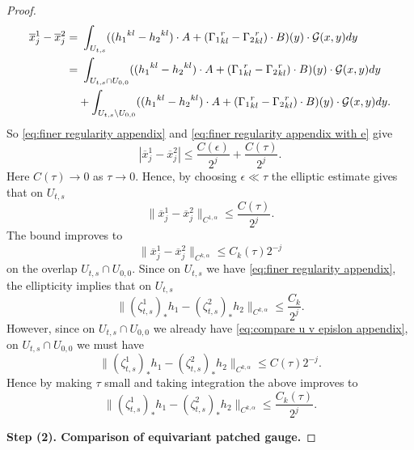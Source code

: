 \documentclass[a4paper,11pt]{amsart}
\theoremstyle{definition}
\numberwithin{equation}{section}
\begin{document}
\begin{proof}
\begin{align}
        \overline{x}_j^1-\overline{x}_j^2=&\ \int_{U_{t,s}} (({h_1}^{kl}-{h_2}^{kl})\cdot A+({\Gamma_1}^{r}_{kl}-{\Gamma_2}^{r}_{kl})\cdot B)(y)\cdot\mathcal{G}(x,y)dy\\
        =&\ \int_{U_{t,s}\cap U_{0,0}} (({h_1}^{kl}-{h_2}^{kl})\cdot A+({\Gamma_1}^{r}_{kl}-{\Gamma_2}^{r}_{kl})\cdot B)(y)\cdot\mathcal{G}(x,y)dy \notag\\
        &+\int_{U_{t,s}\setminus U_{0,0}} (({h_1}^{kl}-{h_2}^{kl})\cdot A+({\Gamma_1}^{r}_{kl}-{\Gamma_2}^{r}_{kl})\cdot B)(y)\cdot\mathcal{G}(x,y)dy.\notag
    \end{align}
    So \eqref{eq:finer regularity appendix} and \eqref{eq:finer regularity appendix with e} give
    $$|\overline{x}_j^1-\overline{x}_j^2|\leq \frac{C(\epsilon)}{2^j}+\frac{C(\tau)}{2^j}.$$
    Here $C(\tau)\to0$ as $\tau\to0$. Hence, by choosing $\epsilon\ll\tau$ the elliptic estimate gives that on $U_{t,s}$
    \begin{equation}
        \|\overline{x}_j^1-\overline{x}_j^2\|_{C^{1,\alpha}}\leq \frac{C(\tau)}{2^j}.
    \end{equation}
    The bound improves to 
    \begin{equation}\label{eq:compare harmonic coordinates for h1 h2 on overlap}
        \|\overline{x}_j^1-\overline{x}_j^2\|_{C^{k,\alpha}}\leq {C_k(\tau)}{2^{-j}}
    \end{equation} 
    on the overlap $U_{t,s}\cap U_{0,0}$.
    Since on $U_{t,s}$ we have \eqref{eq:finer regularity appendix}, the ellipticity  implies that on $U_{t,s}$
    $$\|(\zeta_{t,s}^1)_*h_1-(\zeta_{t,s}^2)_*h_2\|_{C^{k,\alpha}}\leq \frac{C_k}{2^j}.$$
    However, since on $U_{t,s}\cap U_{0,0}$ we already have \eqref{eq:compare u v epislon appendix}, on $U_{t,s}\cap U_{0,0}$ we must have $$\|(\zeta_{t,s}^1)_*h_1-(\zeta_{t,s}^2)_*h_2\|_{C^{k,\alpha}}\leq {C(\tau)}{2^{-j}}.$$ Hence by making $\tau$ small and taking integration the above improves to
    $$\|(\zeta_{t,s}^1)_*h_1-(\zeta_{t,s}^2)_*h_2\|_{C^{k,\alpha}}\leq \frac{C_k(\tau)}{2^j}.$$


    \vspace{10pt}
    \noindent\textbf{Step (2). Comparison of equivariant patched gauge.} 
    \vspace{10pt}


\end{proof}
\end{document}
